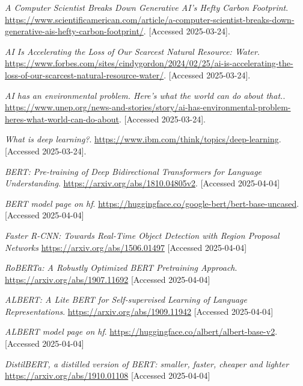 \documentclass[licencjacka,en]{pracamgr}
\begin{document}
\begin{thebibliography}{99}
    \textit{A Computer Scientist Breaks Down Generative AI’s Hefty Carbon Footprint}.
    \url{https://www.scientificamerican.com/article/a-computer-scientist-breaks-down-generative-ais-hefty-carbon-footprint/}.
    [Accessed 2025-03-24].
    
    \textit{AI Is Accelerating the Loss of Our Scarcest Natural Resource: Water}.
    \url{https://www.forbes.com/sites/cindygordon/2024/02/25/ai-is-accelerating-the-loss-of-our-scarcest-natural-resource-water/}.
    [Accessed 2025-03-24].
    
    \textit{AI has an environmental problem. Here’s what the world can do about that.}.
    \url{https://www.unep.org/news-and-stories/story/ai-has-environmental-problem-heres-what-world-can-do-about}.
    [Accessed 2025-03-24].
    
    \textit{What is deep learning?}.
    \url{https://www.ibm.com/think/topics/deep-learning}.
    [Accessed 2025-03-24].
    
    \textit{BERT: Pre-training of Deep Bidirectional Transformers for Language Understanding}.
    \url{https://arxiv.org/abs/1810.04805v2}.
    [Accessed 2025-04-04]
    
    \textit{BERT model page on hf}.
    \url{https://huggingface.co/google-bert/bert-base-uncased}.
    [Accessed 2025-04-04]
    
    \textit{Faster R-CNN: Towards Real-Time Object Detection with Region Proposal Networks}
    \url{https://arxiv.org/abs/1506.01497}
    [Accessed 2025-04-04]
    
    \textit{RoBERTa: A Robustly Optimized BERT Pretraining Approach}.
    \url{https://arxiv.org/abs/1907.11692}
    [Accessed 2025-04-04]
    
    \textit{ALBERT: A Lite BERT for Self-supervised Learning of Language Representations}.
    \url{https://arxiv.org/abs/1909.11942}
    [Accessed 2025-04-04]
    
    \textit{ALBERT model page on hf}.
    \url{https://huggingface.co/albert/albert-base-v2}.
    [Accessed 2025-04-04]
    
    \textit{DistilBERT, a distilled version of BERT: smaller, faster, cheaper and lighter}
    \url{https://arxiv.org/abs/1910.01108}
    [Accessed 2025-04-04]
    

\end{thebibliography}
\end{document}

